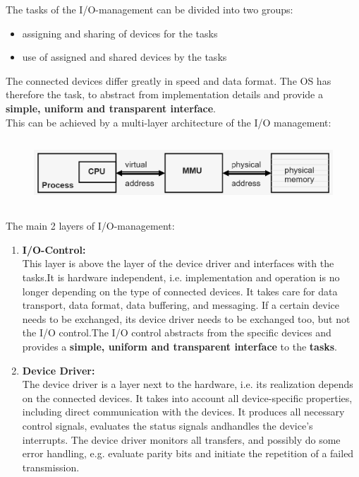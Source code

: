 The tasks of the I/O-management can be divided into two groups:

\begin{itemize}
\item  assigning and sharing of devices for the tasks
\item  use of assigned and shared devices by the tasks
\end{itemize}

The connected devices differ greatly in speed and data format. The OS has therefore the task, to abstract from implementation details and provide a \textbf{simple, uniform and transparent interface}. \\

This can be achieved by a multi-layer architecture of the I/O management:

 	\begin{figure}[h]
    \centering
    \includegraphics[width=12cm, height=2.5cm]{Images/image119.png}
    \label{fig:Fig }
    \end{figure}
    
The main 2 layers of I/O-management:

\begin{enumerate}
\item  \textbf{I/O-Control: }\\This layer is above the layer of the device driver and interfaces with the tasks.It is hardware independent, i.e. implementation and operation is no longer depending on the type of connected devices. It takes care for data transport, data format, data buffering, and messaging. If a certain device needs to be exchanged, its device driver needs to be exchanged too, but not the I/O control.The I/O control abstracts from the specific devices and provides a \textbf{simple, uniform and transparent interface} to the \textbf{tasks}.

\item   \textbf{Device Driver:}\\The device driver is a layer next to the hardware, i.e. its realization depends on the connected devices. It takes into account all device-specific properties, including direct communication with the devices. It produces all necessary control signals, evaluates the status signals andhandles the device's interrupts. The device driver monitors all transfers, and possibly do some error handling, e.g. evaluate parity bits and initiate the repetition of a failed transmission.
\end{enumerate}

